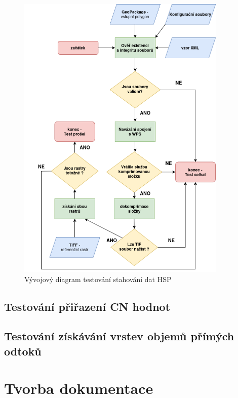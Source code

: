 \documentclass[a4paper,oneside,12pt]{book}
\begin{document}
\begin{figure}[H] \label{obr20}
\centering
\includegraphics[height=14cm]{pictures/test3.png}
\caption{Vývojový diagram testování stahování dat HSP }
\label{fig:test3}
\end{figure}

\subsection{Testování přiřazení CN hodnot} \label{test_CN}

\hspace{10mm} 


\subsection{Testování získávání vrstev objemů přímých odtoků} \label{test_runoff}

\section{Tvorba dokumentace} \label{docs}

\clearpage  %
  \label{zdroje}
\end{document}
